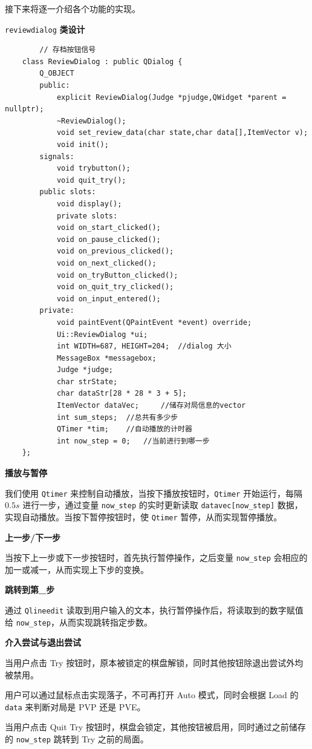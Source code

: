 \documentclass{noithesis}
\begin{document}
    接下来将逐一介绍各个功能的实现。
    
    \verb|reviewdialog| \textbf{类设计}
    
    \begin{lstlisting}
    	// 存档按钮信号
	class ReviewDialog : public QDialog {
		Q_OBJECT
		public:
			explicit ReviewDialog(Judge *pjudge,QWidget *parent = nullptr);
			~ReviewDialog();
			void set_review_data(char state,char data[],ItemVector v);
			void init();
		signals:
			void trybutton(); 
			void quit_try();
		public slots:
			void display();    
			private slots:
			void on_start_clicked();	
			void on_pause_clicked();
			void on_previous_clicked();
			void on_next_clicked();
			void on_tryButton_clicked();
			void on_quit_try_clicked();
			void on_input_entered();
		private:
			void paintEvent(QPaintEvent *event) override;
			Ui::ReviewDialog *ui;
			int WIDTH=687, HEIGHT=204;  //dialog 大小
			MessageBox *messagebox;
			Judge *judge;
			char strState; 
			char dataStr[28 * 28 * 3 + 5];
			ItemVector dataVec;		//储存对局信息的vector
			int sum_steps;  //总共有多少步
			QTimer *tim;    //自动播放的计时器
			int now_step = 0;   //当前进行到哪一步
	};
    \end{lstlisting}
    
    \textbf{播放与暂停}
    
    我们使用 \verb|Qtimer| 来控制自动播放，当按下播放按钮时，\verb|Qtimer| 开始运行，每隔 $0.5s$ 进行一步，通过变量 \verb|now_step| 的实时更新读取 \verb|datavec[now_step]| 数据，实现自动播放。当按下暂停按钮时，使 \verb|Qtimer| 暂停，从而实现暂停播放。
    
	\textbf{上一步/下一步}
	
	当按下上一步或下一步按钮时，首先执行暂停操作，之后变量 \verb|now_step| 会相应的加一或减一，从而实现上下步的变换。

	\textbf{跳转到第\_步}
	
	通过 \verb|Qlineedit| 读取到用户输入的文本，执行暂停操作后，将读取到的数字赋值给 \verb|now_step|，从而实现跳转指定步数。
	
	\textbf{介入尝试与退出尝试}
	
	当用户点击 Try 按钮时，原本被锁定的棋盘解锁，同时其他按钮除退出尝试外均被禁用。
	
	用户可以通过鼠标点击实现落子，不可再打开 Auto 模式，同时会根据 Load 的 \verb|data| 来判断对局是 PVP 还是 PVE。
	
	当用户点击 Quit Try 按钮时，棋盘会锁定，其他按钮被启用，同时通过之前储存的 \verb|now_step| 跳转到 Try 之前的局面。
	
\end{document}
